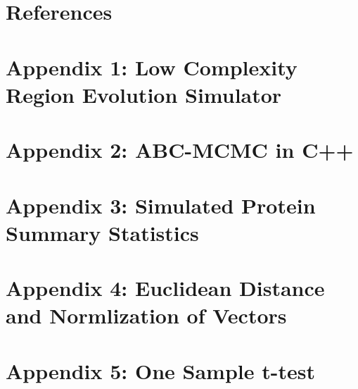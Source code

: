 \documentclass[10pt]{article}
\begin{document}
\section{References}


\nocite{*}
\printbibliography[heading=none, sorting=nyt]
\newpage

\section{Appendix 1: Low Complexity Region Evolution Simulator}

\newpage

\section{Appendix 2: ABC-MCMC in C++}

\newpage

\section{Appendix 3: Simulated Protein Summary Statistics}

\newpage

\section{Appendix 4: Euclidean Distance and Normlization of Vectors}

\newpage

\section{Appendix 5: One Sample t-test}

\newpage
\end{document}
